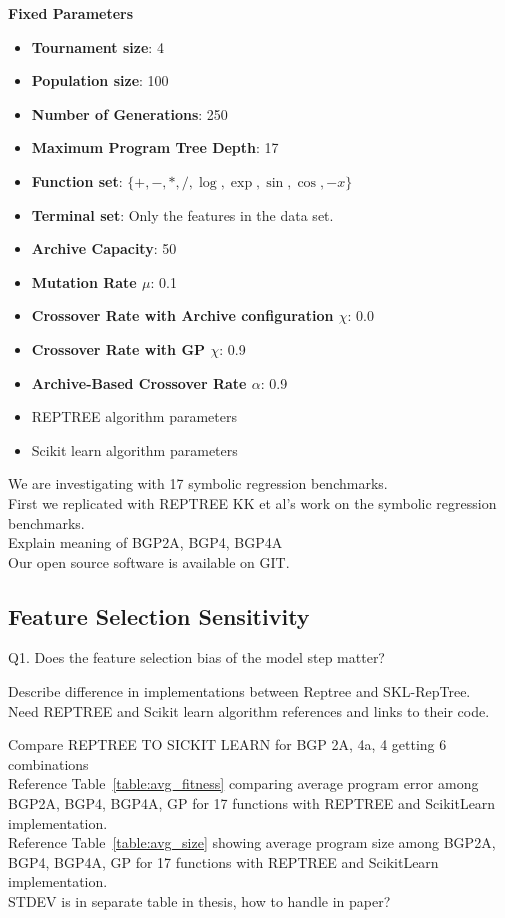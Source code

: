 \textbf{Fixed Parameters}\label{appendix:fixed_parameters}

\begin{itemize}
\item \textbf{Tournament size}: 4
\item \textbf{Population size}: 100
\item \textbf{Number of Generations}: 250
\item \textbf{Maximum Program Tree Depth}: 17
\item \textbf{Function set}: $\{ +, -, *, /, \log, \exp, \sin, \cos, -x \}$
\item \textbf{Terminal set}: Only the features in the data set.
\item \textbf{Archive Capacity}: 50
\item \textbf{Mutation Rate $\mu$}: 0.1
\item \textbf{Crossover Rate with Archive configuration $\chi$}: 0.0
\item \textbf{Crossover Rate with GP $\chi$}: 0.9
\item \textbf{Archive-Based Crossover Rate $\alpha$}: 0.9
\item REPTREE  algorithm parameters 
\item Scikit learn algorithm parameters
\end{itemize}

We are investigating with 17 symbolic regression benchmarks.\\


First we replicated with REPTREE KK et al's work on the symbolic regression benchmarks. \\
Explain meaning of BGP2A, BGP4, BGP4A\\
Our open source software is available on GIT.\\


\subsection{Feature Selection Sensitivity}\label{sect:ftr-select}


Q1. Does the feature selection bias of the model step matter? 

Describe difference in implementations between Reptree and SKL-RepTree.\\
Need REPTREE and Scikit learn algorithm references and links to their code.

Compare REPTREE TO SICKIT LEARN for BGP 2A, 4a, 4 getting 6 combinations\\
Reference Table~\ref{table:avg_fitness} comparing average program error among BGP2A, BGP4, BGP4A, GP for 17 functions with REPTREE and ScikitLearn implementation.\\
Reference Table~\ref{table:avg_size} showing average program size among BGP2A, BGP4, BGP4A, GP for 17 functions with REPTREE and ScikitLearn implementation.\\
STDEV is in separate table in thesis, how to handle in paper?

